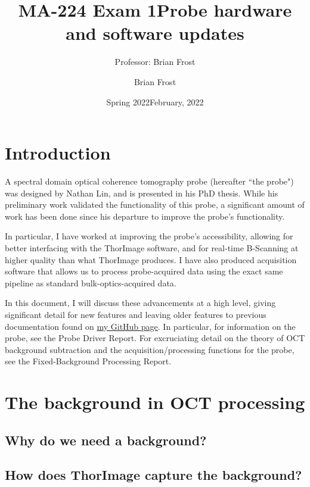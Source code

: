 \documentclass{article}
\title{MA-224 Exam 1}
\author{Professor: Brian Frost}
\date{Spring 2022}
\title{Probe hardware and software updates}
\date{February, 2022}
\author{Brian Frost}
\begin{document}
\maketitle

\section{Introduction}

\par{A spectral domain optical coherence tomography probe (hereafter ``the probe") was designed by Nathan Lin, and is presented in his PhD thesis. While his preliminary work validated the functionality of this probe, a significant amount of work has been done since his departure to improve the probe's functionality.}
\par{In particular, I have worked at improving the probe's accessibility, allowing for better interfacing with the ThorImage software, and for real-time B-Scanning at higher quality than what ThorImage produces. I have also produced acquisition software that allows us to process probe-acquired data using the exact same pipeline as standard bulk-optics-acquired data.}
\par{In this document, I will discuss these advancements at a high level, giving significant detail for new features and leaving older features to previous documentation found on \href{https://github.com/Brian-Frost-LaPlante/LabReports}{my GitHub page}. In particular, for information on the probe, see the Probe Driver Report. For excruciating detail on the theory of OCT background subtraction and the acquisition/processing functions for the probe, see the Fixed-Background Processing Report.}

\section{The background in OCT processing}

\par{}

\subsection{Why do we need a background?}

\par{}

\subsection{How does ThorImage capture the background?}
\end{document}
